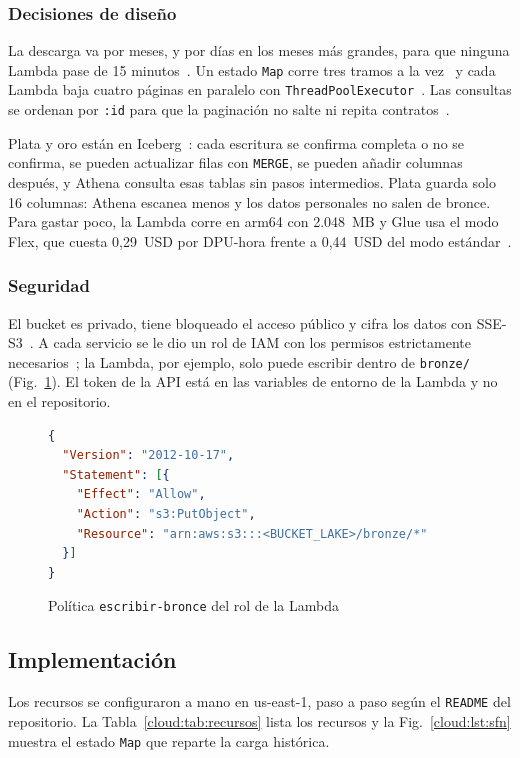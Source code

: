\subsubsection{Decisiones de diseño}
La descarga va por meses, y por días en los meses más grandes, para que ninguna Lambda pase de 15 minutos~\cite{aws_lambda_quotas}. Un estado \texttt{Map} corre tres tramos a la vez~\cite{aws_sfn_map} y cada Lambda baja cuatro páginas en paralelo con \texttt{ThreadPoolExecutor}~\cite{psf_futures}. Las consultas se ordenan por \texttt{:id} para que la paginación no salte ni repita contratos~\cite{tyler_order}.

Plata y oro están en Iceberg~\cite{asf_iceberg_spec}: cada escritura se confirma completa o no se confirma, se pueden actualizar filas con \texttt{MERGE}, se pueden añadir columnas después, y Athena consulta esas tablas sin pasos intermedios. Plata guarda solo 16 columnas: Athena escanea menos y los datos personales no salen de bronce. Para gastar poco, la Lambda corre en arm64 con 2.048~MB y Glue usa el modo Flex, que cuesta 0,29~USD por DPU-hora frente a 0,44~USD del modo estándar~\cite{aws_glue_pricing}.

\subsubsection{Seguridad}
El bucket es privado, tiene bloqueado el acceso público y cifra los datos con SSE-S3~\cite{aws_s3_sse}. A cada servicio se le dio un rol de IAM con los permisos estrictamente necesarios~\cite{aws_iam_bp}; la Lambda, por ejemplo, solo puede escribir dentro de \texttt{bronze/} (Fig.~\ref{cloud:lst:iam}). El token de la API está en las variables de entorno de la Lambda y no en el repositorio.

\begin{figure}[!htbp]



\begin{lstlisting}[language=json]
{
  "Version": "2012-10-17",
  "Statement": [{
    "Effect": "Allow",
    "Action": "s3:PutObject",
    "Resource": "arn:aws:s3:::<BUCKET_LAKE>/bronze/*"
  }]
}
\end{lstlisting}
\caption{Política \texttt{escribir-bronce} del rol de la Lambda}\label{cloud:lst:iam}
\end{figure}

\subsection{Implementación}\label{cloud:sec:impl}
Los recursos se configuraron a mano en us-east-1, paso a paso según el \texttt{README} del repositorio. La Tabla~\ref{cloud:tab:recursos} lista los recursos y la Fig.~\ref{cloud:lst:sfn} muestra el estado \texttt{Map} que reparte la carga histórica.

